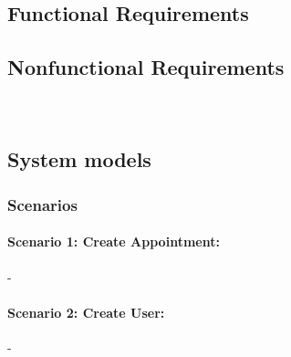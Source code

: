 \documentclass{article}
\begin{document}
	\subsection{Functional Requirements}
	\subsection{Nonfunctional Requirements}				%
		\subsubsection*{}
		\\
	\subsection{System models}							%
		\subsubsection{Scenarios}
			\paragraph{Scenario 1: Create Appointment:}
			 -\\

			\paragraph{Scenario 2: Create User:}
			 -\\
			
\end{document}
